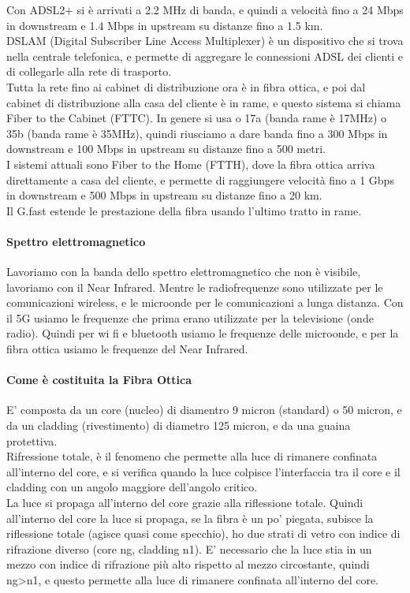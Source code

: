 Con ADSL2+ si è arrivati a 2.2 MHz di banda, e quindi a velocità fino a 24 Mbps in downstream e 1.4 Mbps in upstream su distanze fino a 1.5 km.\\

DSLAM (Digital Subscriber Line Access Multiplexer) è un dispositivo che si trova nella centrale telefonica, e permette di aggregare le connessioni ADSL dei clienti e di 
collegarle alla rete di trasporto.\\

Tutta la rete fino ai cabinet di distribuzione ora è in fibra ottica, e poi dal cabinet di distribuzione alla casa del cliente è in rame, e questo sistema si chiama Fiber to the Cabinet (FTTC).
In genere si usa o 17a (banda rame è 17MHz) o 35b (banda rame è 35MHz), quindi riusciamo a dare banda fino a 300 Mbps in downstream e 100 Mbps in upstream su distanze fino a 500 metri.\\

I sistemi attuali sono Fiber to the Home (FTTH), dove la fibra ottica arriva direttamente a casa del cliente, e permette di raggiungere velocità fino a 1 Gbps in downstream e 500 Mbps in upstream su distanze fino a 20 km.\\
Il G.fast estende le prestazione della fibra usando l'ultimo tratto in rame.

\paragraph{Spettro elettromagnetico}
Lavoriamo con la banda dello spettro elettromagnetico che non è visibile, lavoriamo con il Near Infrared. Mentre le radiofrequenze sono utilizzate per le comunicazioni wireless, e le microonde 
per le comunicazioni a lunga distanza. Con il 5G usiamo le frequenze che prima erano utilizzate per la televisione (onde radio).
Quindi per wi fi e bluetooth usiamo le frequenze delle microonde, e per la fibra ottica usiamo le frequenze del Near Infrared.\\

\paragraph{Come è costituita la Fibra Ottica}
E' composta da un core (nucleo) di diamentro 9 micron (standard) o 50 micron, e da un cladding (rivestimento) di diametro 125 micron, e da una guaina protettiva.\\
Rifressione totale, è il fenomeno che permette alla luce di rimanere confinata all'interno del core, e si verifica quando la luce colpisce l'interfaccia tra il core e il cladding con 
un angolo maggiore dell'angolo critico.\\ 
La luce si propaga all'interno del core grazie alla riflessione totale. Quindi all'interno del core la luce si propaga, se la fibra è un po' piegata, subisce la riflessione totale (agisce quasi come specchio),
ho due strati di vetro con indice di rifrazione diverso (core ng, cladding n1). E' necessario che la luce stia in un mezzo con indice di rifrazione più alto rispetto al mezzo circostante, 
quindi ng>n1, e questo permette alla luce di rimanere confinata all'interno del core.\\

